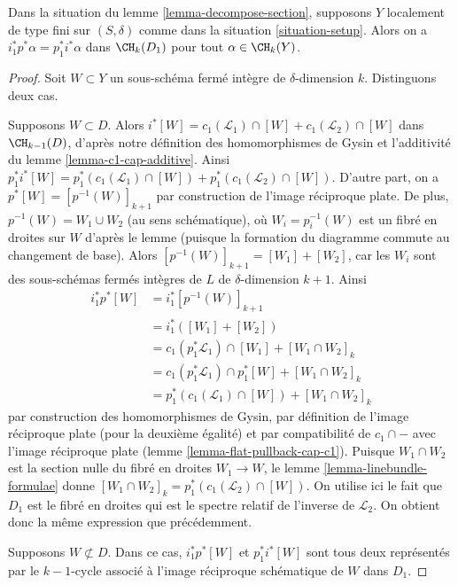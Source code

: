 \begin{lemma}
\label{lemma-decompose-section-formulae}
Dans la situation du lemme \ref{lemma-decompose-section},
supposons $Y$ localement de type fini sur $(S, \delta)$ comme dans la
situation \ref{situation-setup}. Alors on a
$i_1^*p^*\alpha = p_1^*i^*\alpha$
dans $\CH_k(D_1)$ pour tout $\alpha \in \CH_k(Y)$.
\end{lemma}

\begin{proof}
Soit $W \subset Y$ un sous-schéma fermé intègre de $\delta$-dimension $k$.
Distinguons deux cas.

\medskip\noindent
Supposons $W \subset D$. Alors
$i^*[W] = c_1(\mathcal{L}_1) \cap [W] + c_1(\mathcal{L}_2) \cap [W]$
dans $\CH_{k - 1}(D)$, d'après notre définition des homomorphismes de Gysin et
l'additivité du lemme \ref{lemma-c1-cap-additive}.
Ainsi $p_1^*i^*[W] =
p_1^*(c_1(\mathcal{L}_1) \cap [W]) + p_1^*(c_1(\mathcal{L}_2) \cap [W])$.
D'autre part, on a
$p^*[W] = [p^{-1}(W)]_{k + 1}$ par construction de l'image réciproque plate.
De plus, $p^{-1}(W) = W_1 \cup W_2$ (au sens schématique),
où $W_i = p_i^{-1}(W)$ est un fibré en droites sur $W$
d'après le lemme (puisque la formation du diagramme commute au changement de base).
Alors $[p^{-1}(W)]_{k + 1} = [W_1] + [W_2]$, car les $W_i$ sont des sous-schémas fermés
intègres de $L$ de $\delta$-dimension $k + 1$. Ainsi
\begin{align*}
i_1^*p^*[W]
& =
i_1^*[p^{-1}(W)]_{k + 1} \\
& =
i_1^*([W_1] + [W_2]) \\
& =
c_1(p_1^*\mathcal{L}_1) \cap [W_1] + [W_1 \cap W_2]_k \\
& =
c_1(p_1^*\mathcal{L}_1) \cap p_1^*[W] + [W_1 \cap W_2]_k \\
& =
p_1^*(c_1(\mathcal{L}_1) \cap [W]) + [W_1 \cap W_2]_k
\end{align*}
par construction des homomorphismes de Gysin, par définition de l'image réciproque plate
(pour la deuxième égalité) et par compatibilité de $c_1 \cap -$
avec l'image réciproque plate (lemme \ref{lemma-flat-pullback-cap-c1}).
Puisque $W_1 \cap W_2$ est la section nulle du fibré en droites
$W_1 \to W$, le lemme \ref{lemma-linebundle-formulae} donne
$[W_1 \cap W_2]_k = p_1^*(c_1(\mathcal{L}_2) \cap [W])$.
On utilise ici le fait que $D_1$ est le fibré en droites
qui est le spectre relatif de l'inverse de $\mathcal{L}_2$.
On obtient donc la même expression que précédemment.

\medskip\noindent
Supposons $W \not \subset D$. Dans ce cas, $i_1^*p^*[W]$
et $p_1^*i^*[W]$ sont tous deux représentés par le $k - 1$-cycle associé
à l'image réciproque schématique de $W$ dans $D_1$.
\end{proof}


